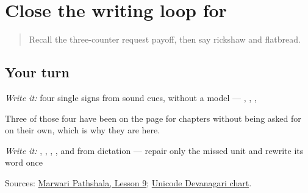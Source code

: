 \section[Practice]{Close the writing loop for }

\label{lesson:MW-R21-script-close}



\begin{quote}
Recall the three-counter request payoff, then say rickshaw and flatbread.
\end{quote}

\subsection*{Your turn}
\emph{Write it:} four single signs from sound cues, without a model — \textbf{}, \textbf{}, \textbf{}, \textbf{}

Three of those four have been on the page for chapters without being asked for on their own, which is why they are here.

\emph{Write it:} \textbf{}, \textbf{}, \textbf{}, \textbf{}, and \textbf{} from dictation — repair only the missed unit and rewrite its word once

\begin{tcolorbox}[breakable,colback=teal!4,colframe=teal!35!black,title={Before you move on}]
Sources: \href{https://www.marwaripathshala.com/marwari-lesson-9-english}{Marwari Pathshala, Lesson 9}; \href{https://www.unicode.org/charts/PDF/U0900.pdf}{Unicode Devanagari chart}.
\end{tcolorbox}
